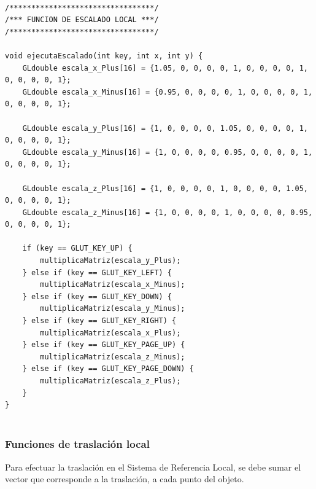 \documentclass[12pt,a4paper]{article}
\begin{document}
\begin{lstlisting}

/*********************************/
/*** FUNCION DE ESCALADO LOCAL ***/
/*********************************/

void ejecutaEscalado(int key, int x, int y) {
    GLdouble escala_x_Plus[16] = {1.05, 0, 0, 0, 0, 1, 0, 0, 0, 0, 1, 0, 0, 0, 0, 1};
    GLdouble escala_x_Minus[16] = {0.95, 0, 0, 0, 0, 1, 0, 0, 0, 0, 1, 0, 0, 0, 0, 1};

    GLdouble escala_y_Plus[16] = {1, 0, 0, 0, 0, 1.05, 0, 0, 0, 0, 1, 0, 0, 0, 0, 1};
    GLdouble escala_y_Minus[16] = {1, 0, 0, 0, 0, 0.95, 0, 0, 0, 0, 1, 0, 0, 0, 0, 1};

    GLdouble escala_z_Plus[16] = {1, 0, 0, 0, 0, 1, 0, 0, 0, 0, 1.05, 0, 0, 0, 0, 1};
    GLdouble escala_z_Minus[16] = {1, 0, 0, 0, 0, 1, 0, 0, 0, 0, 0.95, 0, 0, 0, 0, 1};

    if (key == GLUT_KEY_UP) {
        multiplicaMatriz(escala_y_Plus);
    } else if (key == GLUT_KEY_LEFT) {
        multiplicaMatriz(escala_x_Minus);
    } else if (key == GLUT_KEY_DOWN) {
        multiplicaMatriz(escala_y_Minus);
    } else if (key == GLUT_KEY_RIGHT) {
        multiplicaMatriz(escala_x_Plus);
    } else if (key == GLUT_KEY_PAGE_UP) {
        multiplicaMatriz(escala_z_Minus);
    } else if (key == GLUT_KEY_PAGE_DOWN) {
        multiplicaMatriz(escala_z_Plus);
    }
}


\end{lstlisting}

\subsubsection{Funciones de traslación local}

Para efectuar la traslación en el Sistema de Referencia Local, se debe sumar el vector que corresponde a la traslación, a cada punto del objeto.
\end{document}
